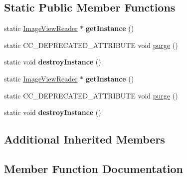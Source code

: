 \subsection*{Static Public Member Functions}
\begin{DoxyCompactItemize}
\item 
\mbox{\label{classcocostudio_1_1ImageViewReader_aca799877677ad1db1edebe377a5c56f9}} 
static \hyperlink{classcocostudio_1_1ImageViewReader}{Image\+View\+Reader} $\ast$ {\bfseries get\+Instance} ()
\item 
static C\+C\+\_\+\+D\+E\+P\+R\+E\+C\+A\+T\+E\+D\+\_\+\+A\+T\+T\+R\+I\+B\+U\+TE void \hyperlink{classcocostudio_1_1ImageViewReader_a49200992465644cb23ea821ca066d8b3}{purge} ()
\item 
\mbox{\label{classcocostudio_1_1ImageViewReader_a8bf9049a44bf53a4b8905f32e37a85d2}} 
static void {\bfseries destroy\+Instance} ()
\item 
\mbox{\label{classcocostudio_1_1ImageViewReader_a552f73123cb2b2dde4c16455309605d2}} 
static \hyperlink{classcocostudio_1_1ImageViewReader}{Image\+View\+Reader} $\ast$ {\bfseries get\+Instance} ()
\item 
static C\+C\+\_\+\+D\+E\+P\+R\+E\+C\+A\+T\+E\+D\+\_\+\+A\+T\+T\+R\+I\+B\+U\+TE void \hyperlink{classcocostudio_1_1ImageViewReader_a49200992465644cb23ea821ca066d8b3}{purge} ()
\item 
\mbox{\label{classcocostudio_1_1ImageViewReader_a013d8979eab7bd5dc8fff74343ab1c05}} 
static void {\bfseries destroy\+Instance} ()
\end{DoxyCompactItemize}
\subsection*{Additional Inherited Members}


\subsection{Member Function Documentation}
\mbox{\label{classcocostudio_1_1ImageViewReader_a49200992465644cb23ea821ca066d8b3}} 
